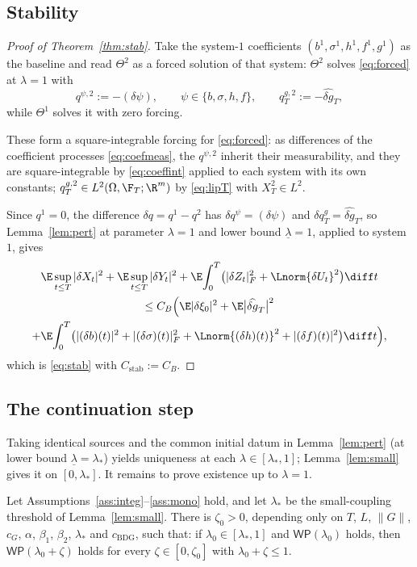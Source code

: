 \subsection{Stability}\label{sub:stabuniq}

\begin{proof}[Proof of Theorem~\ref{thm:stab}]
Take the system-$1$ coefficients $(b^1,\sigma^1,h^1,f^1,g^1)$ as the baseline and read
$\Theta^2$ as a forced solution of that system: $\Theta^2$ solves \eqref{eq:forced} at
$\lambda=1$ with
\[
q^{\psi,2}:=-(\delta\psi),\qquad \psi\in\{b,\sigma,h,f\},\qquad
q^{g,2}_T:=-\widehat{\delta g}_T ,
\]
while $\Theta^1$ solves it with zero forcing.

These form a square-integrable forcing for \eqref{eq:forced}: as differences of the
coefficient processes \eqref{eq:coefmeas}, the $q^{\psi,2}$ inherit their measurability,
and they are square-integrable by \eqref{eq:coeffint} applied to each system with its own
constants; $q^{g,2}_T\in L^2(\Omega,\F_T;\R^m)$ by \eqref{eq:lipT} with $X^2_T\in L^2$.

Since $q^1=0$, the difference $\delta q=q^1-q^2$ has $\delta q^\psi=(\delta\psi)$ and
$\delta q^g_T=\widehat{\delta g}_T$, so Lemma~\ref{lem:pert} at parameter $\lambda=1$ and
lower bound $\underline\lambda=1$, applied to
system~$1$, gives
\begin{multline*}
\E\sup_{t\le T}|\delta X_t|^2+\E\sup_{t\le T}|\delta Y_t|^2
+\E\!\int_0^T\!\big(|\delta Z_t|_F^2+\Lnorm{\delta U_t}^2\big)\diff t\\
\le C_B\Big(\E|\delta\xi_0|^2+\E\big|\widehat{\delta g}_T\big|^2\\
+\E\!\int_0^T\!\big(|(\delta b)(t)|^2+|(\delta\sigma)(t)|_F^2
+\Lnorm{(\delta h)(t)}^2+|(\delta f)(t)|^2\big)\diff t\Big),
\end{multline*}
which is \eqref{eq:stab} with $C_{\mathrm{stab}}:=C_B$.
\end{proof}

\subsection{The continuation step}

Taking identical sources and the common initial datum in Lemma~\ref{lem:pert} (at
lower bound $\underline\lambda=\lambda_*$) yields
uniqueness at each $\lambda\in[\lambda_*,1]$; Lemma~\ref{lem:small} gives it on
$[0,\lambda_*]$. It remains to prove existence up to $\lambda=1$.

\begin{lemma}[Continuation]\label{lem:cont}
Let Assumptions~\ref{ass:integ}--\ref{ass:mono} hold, and let $\lambda_*$ be the
small-coupling threshold of Lemma~\ref{lem:small}. There is $\zeta_0>0$, depending only on
$T$, $L$, $\|G\|$, $c_G$, $\alpha$, $\beta_1$, $\beta_2$, $\lambda_*$ and $c_{\mathrm{BDG}}$, such that: if
$\lambda_0\in[\lambda_*,1]$ and $\mathsf{WP}(\lambda_0)$ holds, then
$\mathsf{WP}(\lambda_0+\zeta)$ holds for every $\zeta\in[0,\zeta_0]$ with $\lambda_0+\zeta\le1$.
\end{lemma}

